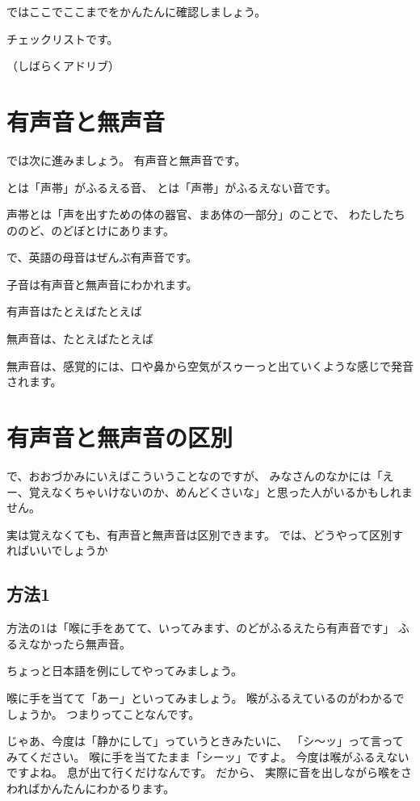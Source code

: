 \documentclass[book,jafontscale=0.9247]{jlreq}
\let\textipa\relax
\begin{document}
ではここでここまでをかんたんに確認しましょう。

チェックリストです。

（しばらくアドリブ）

\section{有声音と無声音}

では次に進みましょう。
有声音と無声音です。

とは「声帯」がふるえる音、
とは「声帯」がふるえない音です。

声帯とは「声を出すための体の器官、まあ体の一部分」のことで、
わたしたちののど、のどぼとけにあります。

で、英語の母音はぜんぶ有声音です。

子音は有声音と無声音にわかれます。

有声音はたとえばたとえば \textipa{/b/}\,\,\,\textipa{/d/}\,\,\,\textipa{/g/}\,\,\,\textipa{/v/}\,\,\,\textipa{/z/}

無声音は、たとえばたとえば \textipa{/p/}\,\,\,\textipa{/t/}\,\,\,\textipa{/k/}\,\,\,\textipa{/f/}\,\,\,\textipa{/s/}

無声音は、感覚的には、口や鼻から空気がスゥーっと出ていくような感じで発音されます。

\section{有声音と無声音の区別}
で、おおづかみにいえばこういうことなのですが、
みなさんのなかには「えー、覚えなくちゃいけないのか、めんどくさいな」と思った人がいるかもしれません。

実は覚えなくても、有声音と無声音は区別できます。
では、どうやって区別すればいいでしょうか

\subsection{方法1}
方法の1は「喉に手をあてて、いってみます、のどがふるえたら有声音です」
ふるえなかったら無声音。

ちょっと日本語を例にしてやってみましょう。

喉に手を当てて「あー」といってみましょう。
喉がふるえているのがわかるでしょうか。
つまりってことなんです。


じゃあ、今度は「静かにして」っていうときみたいに、
「シ〜ッ」って言ってみてください。
喉に手を当てたまま「シーッ」ですよ。
今度は喉がふるえないですよね。
息が出て行くだけなんです。
だから、
実際に音を出しながら喉をさわればかんたんにわかるります。
\end{document}
